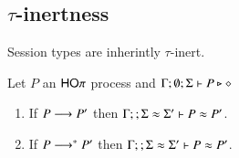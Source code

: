 

\subsection{$\tau$-inertness}

Session types are inherintly $\tau$-inert.

\begin{lemma}\rm
	\label{lem:tau_inert}
	Let $P$ an $\mathsf{HO}\pi$ process
	and $\Gamma; \emptyset; \Sigma \vdash P \triangleright \diamond$
	\begin{enumerate}
		\item	If $P \longrightarrow P'$ then $\Gamma; \empty; \Sigma \wb \Sigma' \proves P \wb P'$.
		\item	If $P \longrightarrow^* P'$ then $\Gamma; \empty; \Sigma \wb \Sigma' \proves P \wb P'$.
	\end{enumerate}
\end{lemma}

